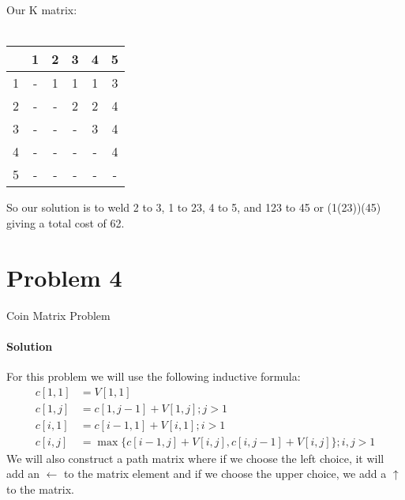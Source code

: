 \documentclass[12pt]{article}
\begin{document}
Our K matrix:\\
\\
\begin{table}[h]
\centering
\begin{tabular}{|c|c|c|c|c|c|}
\hline
\multicolumn{1}{|l|}{} & \multicolumn{1}{|l|}{1} & \multicolumn{1}{l|}{2} & \multicolumn{1}{l|}{3} & \multicolumn{1}{l|}{4} & \multicolumn{1}{l|}{5} \\ \hline
1&  -                   &     1                 &       1               &          1            &   3                \\ \hline
2&-                       & -                     &      2                 &       2               &    4               \\ \hline
3&-                       & -                     & -                     &     3                  &      4                 \\ \hline
4&-                       & -                     & -                     & -                     &   4                    \\ \hline
5&-                       & -                     & -                     & -                     &   -                   \\ \hline
\end{tabular}
\end{table}

So our solution is to weld 2 to 3, 1 to 23, 4 to 5, and 123 to 45 or (1(23))(45) giving a total cost of 62.

\section{Problem 4}
Coin Matrix Problem
\paragraph{Solution}
For this problem we will use the following inductive formula:
\\
\begin{align*}
c[1,1] & = V[1,1] \\
c[1,j] & = c[1,j-1] + V[1,j]; j>1\\
c[i,1] & = c[i-1,1] + V[i,1]; i >1\\
c[i,j] & = \max \{ c[i-1,j] + V[i,j], c[i,j-1]+V[i,j] \}; i,j >1
\end{align*}
We will also construct a path matrix where if we choose the left choice, it will add an $ \leftarrow$ to the matrix element and if we choose the upper choice, we add a $\uparrow$ to the matrix.
\end{document}
